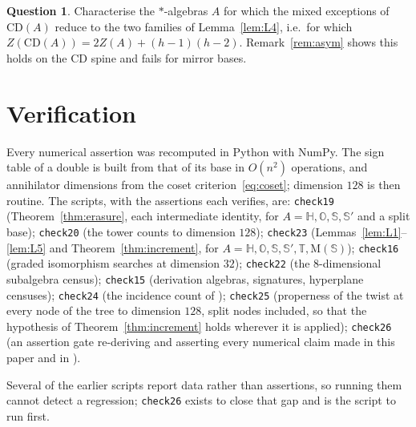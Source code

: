 \documentclass[11pt]{amsart}
\theoremstyle{plain}
\theoremstyle{definition}
\newtheorem{question}[theorem]{Question}
\newcommand{\CD}{\mathrm{CD}}
\newcommand{\MM}{\mathrm{M}}
\newcommand{\OO}{\mathbb{O}}
\newcommand{\HH}{\mathbb{H}}
\newcommand{\Sed}{\mathbb{S}}
\newcommand{\Trig}{\mathbb{T}}
\begin{document}
\begin{question}
Characterise the $*$-algebras $A$ for which the mixed exceptions of $\CD(A)$
reduce to the two families of Lemma~\ref{lem:L4}, i.e.\ for which
$Z(\CD(A))=2Z(A)+(h-1)(h-2)$. Remark~\ref{rem:asym} shows this holds on the
$\CD$ spine and fails for mirror bases.
\end{question}

\appendix
\section{Verification}\label{app:ver}

Every numerical assertion was recomputed in Python with NumPy. The sign table of
a double is built from that of its base in $O(n^{2})$ operations, and
annihilator dimensions from the coset criterion~\eqref{eq:coset}; dimension $128$
is then routine. The scripts, with the assertions each verifies, are:
\texttt{check19} (Theorem~\ref{thm:erasure}, each intermediate identity, for
$A=\HH,\OO,\Sed,\Sed'$ and a split base);
\texttt{check20} (the tower counts to dimension $128$);
\texttt{check23} (Lemmas~\ref{lem:L1}--\ref{lem:L5} and
Theorem~\ref{thm:increment}, for $A=\HH,\OO,\Sed,\Sed',\Trig,\MM(\Sed)$);
\texttt{check16} (graded isomorphism searches at dimension $32$);
\texttt{check22} (the $8$-dimensional subalgebra census);
\texttt{check15} (derivation algebras, signatures, hyperplane censuses);
\texttt{check24} (the incidence count of \cite{LuiI});
\texttt{check25} (properness of the twist at every node of the tree to dimension
$128$, split nodes included, so that the hypothesis of
Theorem~\ref{thm:increment} holds wherever it is applied);
\texttt{check26} (an assertion gate re-deriving and asserting every numerical
claim made in this paper and in \cite{LuiI}).

Several of the earlier scripts report data rather than assertions, so running
them cannot detect a regression; \texttt{check26} exists to close that gap and
is the script to run first.
\end{document}
